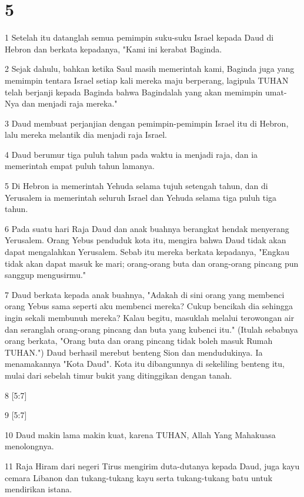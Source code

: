 \chapter{5}

\par 1 Setelah itu datanglah semua pemimpin suku-suku Israel kepada Daud di Hebron dan berkata kepadanya, "Kami ini kerabat Baginda.
\par 2 Sejak dahulu, bahkan ketika Saul masih memerintah kami, Baginda juga yang memimpin tentara Israel setiap kali mereka maju berperang, lagipula TUHAN telah berjanji kepada Baginda bahwa Bagindalah yang akan memimpin umat-Nya dan menjadi raja mereka."
\par 3 Daud membuat perjanjian dengan pemimpin-pemimpin Israel itu di Hebron, lalu mereka melantik dia menjadi raja Israel.
\par 4 Daud berumur tiga puluh tahun pada waktu ia menjadi raja, dan ia memerintah empat puluh tahun lamanya.
\par 5 Di Hebron ia memerintah Yehuda selama tujuh setengah tahun, dan di Yerusalem ia memerintah seluruh Israel dan Yehuda selama tiga puluh tiga tahun.
\par 6 Pada suatu hari Raja Daud dan anak buahnya berangkat hendak menyerang Yerusalem. Orang Yebus penduduk kota itu, mengira bahwa Daud tidak akan dapat mengalahkan Yerusalem. Sebab itu mereka berkata kepadanya, "Engkau tidak akan dapat masuk ke mari; orang-orang buta dan orang-orang pincang pun sanggup mengusirmu."
\par 7 Daud berkata kepada anak buahnya, "Adakah di sini orang yang membenci orang Yebus sama seperti aku membenci mereka? Cukup bencikah dia sehingga ingin sekali membunuh mereka? Kalau begitu, masuklah melalui terowongan air dan seranglah orang-orang pincang dan buta yang kubenci itu." (Itulah sebabnya orang berkata, "Orang buta dan orang pincang tidak boleh masuk Rumah TUHAN.") Daud berhasil merebut benteng Sion dan mendudukinya. Ia menamakannya "Kota Daud". Kota itu dibangunnya di sekeliling benteng itu, mulai dari sebelah timur bukit yang ditinggikan dengan tanah.
\par 8 [5:7]
\par 9 [5:7]
\par 10 Daud makin lama makin kuat, karena TUHAN, Allah Yang Mahakuasa menolongnya.
\par 11 Raja Hiram dari negeri Tirus mengirim duta-dutanya kepada Daud, juga kayu cemara Libanon dan tukang-tukang kayu serta tukang-tukang batu untuk mendirikan istana.
